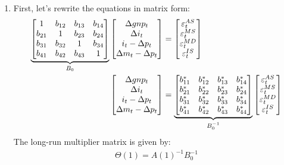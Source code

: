 \begin{enumerate}

\item First, let's rewrite the equations in matrix form:
\begin{align*}
\underbrace{%
\begin{bmatrix}
1 & b_{12} & b_{13} & b_{14}\\
b_{21} & 1 & b_{23} & b_{24}\\
b_{31} & b_{32} & 1 & b_{34}\\
b_{41} & b_{42} & b_{43} & 1
\end{bmatrix}}_{B_{0}}
\begin{bmatrix}
\Delta gnp_t\\
\Delta i_t\\
i_t - \Delta p_t\\
\Delta m_t - \Delta p_t
\end{bmatrix}
&=
\begin{bmatrix}
\varepsilon_t^{AS}\\
\varepsilon_t^{MS}\\
\varepsilon_t^{MD}\\
\varepsilon_t^{IS}
\end{bmatrix}
\\
\begin{bmatrix}
\Delta gnp_t\\
\Delta i_t\\
i_t - \Delta p_t\\
\Delta m_t - \Delta p_t
\end{bmatrix}
&=
\underbrace{%
\begin{bmatrix}
b^*_{11} & b^*_{12} & b^*_{13} & b^*_{14}\\
b^*_{21} & b^*_{22} & b^*_{23} & b^*_{24}\\
b^*_{31} & b^*_{32} & b^*_{33} & b^*_{34}\\
b^*_{41} & b^*_{42} & b^*_{43} & b^*_{44}
\end{bmatrix}}_{B^{-1}_0}
\begin{bmatrix}
\varepsilon_t^{AS}\\
\varepsilon_t^{MS}\\
\varepsilon_t^{MD}\\
\varepsilon_t^{IS}
\end{bmatrix}
\end{align*}
The long-run multiplier matrix is given by:
\begin{align*}
\Theta(1) = {A(1)}^{-1} B^{-1}_0
\end{align*}


\end{enumerate}

